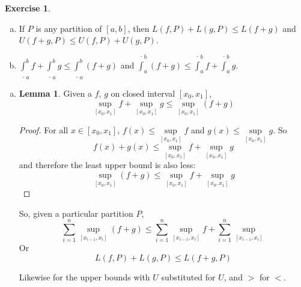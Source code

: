 \documentclass[11pt,oneside]{article}
\numberwithin{equation}{section}
\theoremstyle{definition}
\newtheorem{exercise}{Exercise}
\newtheorem{lemma}{Lemma}
\begin{document}
\begin{exercise}
  \begin{enumerate}[(a)]
  \item
    If $P$ is any partition of $[a,b]$, then $L(f, P) + L(g, P) \leq L(f+g) $ and
    $U(f+g, P) \leq U(f,P) + U(g, P)$.
  \item
    $ \underline \int _ a ^ b f + \underline \int _a ^b g \leq \underline \int _ a ^ b (f + g) $ and
    $ \overline \int _ a ^ b (f + g) \leq \overline \int _ a ^ b f + \overline \int _a ^b g $.
  \end{enumerate}
    
\end{exercise}
\begin{solution}
\begin{enumerate}[(a)]
\item

  \begin{lemma}
    Given a $f$, $g$ on closed interval $[x_0, x_1]$,
    $$
    \sup \limits_{[x_0, x_1]} f + \sup \limits_{[x_0, x_1]} g \leq   \sup \limits_{[x_0, x_1]}  ( f + g)
    $$
  \end{lemma}
  \begin{proof}
    For all $ x \in [x_0, x_1]$, $f(x) \leq \sup \limits_{[x_0, x_1]} f$ and
    $g(x) \leq \sup \limits_{[x_0, x_1]} g$.
    So
    $$
    f(x) + g(x) \leq  \sup \limits_{[x_0, x_1]} f + \sup \limits_{[x_0, x_1]} g
    $$
    and therefore the least upper bound is also less:
    $$
    \sup \limits_{[x_0, x_1]} ( f + g ) \leq \sup \limits_{[x_0, x_1]} f + \sup \limits_{[x_0, x_1]} g
    $$
  \end{proof}
  
  So, given a particular partition $P$,
  $$
  \sum _{ i = 1} ^ { n} \sup \limits_{[x_{i-1}, x_i]} (f + g) \leq \sum _ { i = 1} ^ {n}  \sup \limits_{[x_{i-1}, x_i]} f +  \sum _{ i = 1} ^ {n}  \sup \limits_{[x_{i-1}, x_i]}
  $$
  Or
  $$
  L(f, P) + L(g, P) \leq L(f+g, P)
  $$
  
  Likewise for the upper bounds with $U$ substituted for $U$, and $>$ for $<$.
  

\end{enumerate}
\end{solution}
\end{document}
